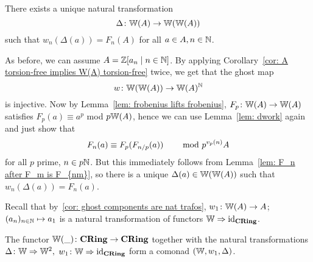 \begin{proposition} \label{prop: existence of diagonal}
    There exists a unique natural transformation
    \[
      \Delta \colon \mathbb{W}(A) \to \mathbb{W}(\mathbb{W}(A))  
    \]
    such that $w_n(\Delta(a))=F_n(A)$ for all $a \in A, n \in \mathbb{N}$.
\end{proposition}
\begin{beweis}
As before, we can assume $A = \mathbb{Z}[a_n \mid n \in \mathbb{N}]$.
By applying Corollary~\ref{cor: A torsion-free implies W(A) torsion-free}
twice, we get that the ghost map 
\[
    w \colon \mathbb{W}(\mathbb{W}(A)) \to \mathbb{W}(A)^{\mathbb{N}}
\]
is injective. Now by Lemma~\ref{lem: frobenius lifts frobenius}, 
$F_p \colon \mathbb{W}(A) \to \mathbb{W}(A)$ satisfies $F_p(a) \equiv a^p$ mod $p\mathbb{W}(A)$,
hence we can use Lemma~\ref{lem: dwork} again and just show that
\[
  F_n(a)   \equiv F_p(F_{n/p}(a)) \text{\hskip8mm mod }p^{v_p(n)}A
\]
for all $p$ prime, $n \in p\mathbb{N}$. But this immediately follows from 
Lemma~\ref{lem: F_n after F_m is F_{nm}}, so there is a unique $\Delta(a)
\in \mathbb{W}(\mathbb{W}(A))$ such that $w_n(\Delta(a)) = F_n(a)$.
\end{beweis}
Recall that by~\ref{cor: ghost components are nat trafos},
$w_1 \colon \mathbb{W}(A) \to A$; $(a_n)_{n \in \mathbb{N}} \mapsto a_1$
is a natural transformation of functors $\mathbb{W} \Rightarrow \operatorname{id}_{\mathbf{CRing}}$.
\begin{theorem} \label{thm: comonad structure}
    The functor $\mathbb{W}(\_) \colon \mathbf{CRing} \to \mathbf{CRing}$ together with the
    natural transformations $\Delta \colon \mathbb{W} \Rightarrow \mathbb{W}^2,$ $w_1 \colon 
    \mathbb{W} \Rightarrow \operatorname{id}_{\mathbf{CRing}}$ form a comonad $(\mathbb{W},w_1,\Delta)$.
\end{theorem}
